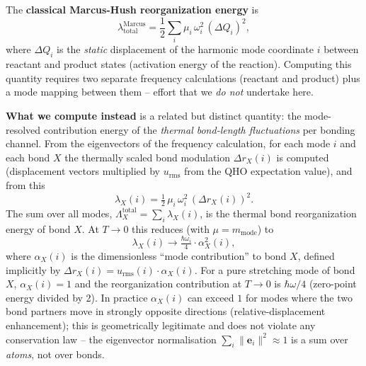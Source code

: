 \documentclass[11pt,a4paper,twoside]{article}
\newcommand{\evec}{\mathbf{e}}
\theoremstyle{remark}
\begin{document}
The \textbf{classical Marcus-Hush reorganization energy}
\cite{Marcus1956,Marcus1993} is
\begin{equation}
  \lambda^{\text{Marcus}}_\text{total}
  = \frac{1}{2}\sum_i \mu_i\,\omega_i^2\,(\Delta Q_i)^2,
  \label{eq:marcus-hush}
\end{equation}
where $\Delta Q_i$ is the \emph{static} displacement of the
harmonic mode coordinate $i$ between reactant and product states
(activation energy of the reaction). Computing this quantity
requires two separate frequency calculations (reactant and
product) plus a mode mapping between them -- effort that we
\emph{do not} undertake here.

\textbf{What we compute instead} is a related but distinct
quantity: the mode-resolved contribution energy of the
\emph{thermal bond-length fluctuations} per bonding channel. From
the eigenvectors of the frequency calculation, for each mode $i$
and each bond $X$ the thermally scaled bond modulation
$\Delta r_X(i)$ is computed (displacement vectors multiplied by
$u_\text{rms}$ from the QHO expectation value), and from this
\begin{equation}
  \lambda_X(i) = \tfrac{1}{2}\,\mu_i\,\omega_i^2\,(\Delta r_X(i))^2.
  \label{eq:lambda-mode}
\end{equation}
The sum over all modes,
$\Lambda_X^\text{total} = \sum_i \lambda_X(i)$, is the thermal
bond reorganization energy of bond $X$. At $T \to 0$ this reduces
(with $\mu = m_\text{mode}$) to
\begin{equation}
  \lambda_X(i) \to \tfrac{\hbar\omega_i}{4} \cdot \alpha_X^2(i),
\end{equation}
where $\alpha_X(i)$ is the dimensionless ``mode contribution'' to
bond $X$, defined implicitly by
$\Delta r_X(i) = u_\text{rms}(i) \cdot \alpha_X(i)$. For a pure
stretching mode of bond $X$, $\alpha_X(i) = 1$ and the
reorganization contribution at $T \to 0$ is $\hbar\omega/4$
(zero-point energy divided by 2). In practice $\alpha_X(i)$ can
exceed $1$ for modes where the two bond partners move in
strongly opposite directions (relative-displacement enhancement);
this is geometrically legitimate and does not violate any
conservation law -- the eigenvector normalisation
$\sum_i \lVert\evec_i\rVert^2 \approx 1$ is a sum over
\emph{atoms}, not over bonds.
\end{document}
